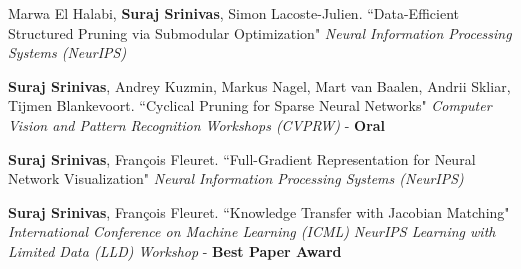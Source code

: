 \documentclass[11pt,a4paper,sans,english]{moderncv}        %
\begin{document}
 {Marwa El Halabi, \textbf{Suraj Srinivas}, Simon Lacoste-Julien.
\newline ``Data-Efficient Structured Pruning via Submodular Optimization" \newline \textit{Neural Information Processing Systems (NeurIPS)}}

\vspace*{0.25em}
 {\textbf{Suraj Srinivas}, Andrey Kuzmin, Markus Nagel, Mart van Baalen, \newline Andrii Skliar, Tijmen Blankevoort. \newline ``Cyclical Pruning for Sparse Neural Networks" 
\newline \textit{Computer Vision and Pattern Recognition Workshops (CVPRW)} - \textbf{Oral}}

\vspace*{0.25em}
\vspace*{0.25em}

 {\textbf{Suraj Srinivas}, Fran\c{c}ois Fleuret. \newline ``Full-Gradient Representation
for Neural Network Visualization" \newline \textit{Neural Information Processing Systems (NeurIPS)}
}
\vspace*{0.25em}

 {\textbf{Suraj Srinivas}, Fran\c{c}ois Fleuret.
\newline ``Knowledge Transfer with Jacobian Matching" 
\newline \textit{International Conference on Machine Learning (ICML)}
\newline \textit{NeurIPS Learning with Limited Data (LLD) Workshop} - \textbf{Best Paper Award}
}
\vspace*{0.25em}


\vspace*{0.25em}
\end{document}
